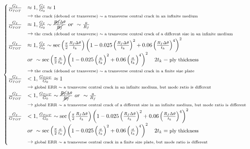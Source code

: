 \documentclass[a4paper]{jpconf}
\begin{document}
\begin{equation}
\begin{cases}
\frac{G_{I}}{G_{TOT}}&\approx 1, \frac{G_{I}}{G_{0}}\approx 1\\ &\rightarrow\text{\scriptsize the crack (debond or transverse) $\sim$ a transverse central crack in an infinite medium}\\
\frac{G_{I}}{G_{TOT}}&\approx 1, \frac{G_{I}}{G_{0}}\sim\frac{\cancel{R_{f}}\Delta\theta}{\cancel{R_{f}}}\ or\  \sim\frac{a}{R_{f}}\\ &\rightarrow\text{\scriptsize the crack (debond or transverse) $\sim$ a transverse central crack of a different size in an infinite medium}\\
\frac{G_{I}}{G_{TOT}}&\approx 1, \frac{G_{I}}{G_{0}}\sim\sec{\left(\frac{\pi}{2}\frac{R_{f}\Delta\theta}{t_{k}}\right)}\left(1-0.025\left(\frac{R_{f}\Delta\theta}{t_{k}}\right)^{2}+0.06\left(\frac{R_{f}\Delta\theta}{t_{k}}\right)^{4}\right)^{2}\\&or\ \sim\sec{\left(\frac{\pi}{2}\frac{a}{t_{k}}\right)}\left(1-0.025\left(\frac{a}{t_{k}}\right)^{2}+0.06\left(\frac{a}{t_{k}}\right)^{4}\right)^{2}\quad 2t_{k}=\text{\small ply thickness}\\ &\rightarrow\text{\scriptsize the crack (debond or transverse) $\sim$ a transverse central crack in a finite size plate}\\
\frac{G_{I}}{G_{TOT}}&< 1, \frac{G_{TOT}}{G_{0}}\approx 1\\ &\rightarrow\text{\scriptsize global ERR $\sim$ a transverse central crack in an infinite medium, but mode ratio is different}\\
\frac{G_{I}}{G_{TOT}}&< 1, \frac{G_{TOT}}{G_{0}}\sim\frac{\cancel{R_{f}}\Delta\theta}{\cancel{R_{f}}}\ or\  \sim\frac{a}{R_{f}}\\ &\rightarrow\text{\scriptsize  global ERR $\sim$ a transverse central crack of a different size in an infinite medium, but mode ratio is different}\\
\frac{G_{I}}{G_{TOT}}&< 1, \frac{G_{TOT}}{G_{0}}\sim\sec{\left(\frac{\pi}{2}\frac{R_{f}\Delta\theta}{t_{k}}\right)}\left(1-0.025\left(\frac{R_{f}\Delta\theta}{t_{k}}\right)^{2}+0.06\left(\frac{R_{f}\Delta\theta}{t_{k}}\right)^{4}\right)^{2}\\&or\ \sim\sec{\left(\frac{\pi}{2}\frac{a}{t_{k}}\right)}\left(1-0.025\left(\frac{a}{t_{k}}\right)^{2}+0.06\left(\frac{a}{t_{k}}\right)^{4}\right)^{2}\quad 2t_{k}=\text{\small ply thickness}\\ &\rightarrow\text{\scriptsize  global ERR $\sim$ a transverse central crack in a finite size plate, but mode ratio is different}\\

\end{cases}
\end{equation}
\end{document}
